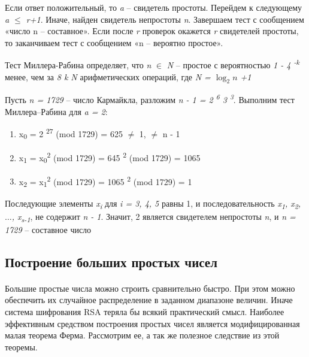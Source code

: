   Если ответ положительный, то \textit{a} – свидетель простоты. Перейдем к следующему \textit{a {$\leq$} r+1}. Иначе, найден свидетель 
непростоты \textit{n}. Завершаем тест с сообщением «число n – составное». Если после \textit{r} проверок окажется \textit{r} свидетелей
простоты, то заканчиваем тест с сообщением «n – вероятно простое».

  \begin{statement}

      Тест Миллера-Рабина определяет, что \textit{n} {$\in$} \textit{N} – простое с вероятностью
    \textit{1 - 4\textsuperscript{ -k}} менее, чем за \textit{8 k N} арифметических операций, где \textit{N = {$\log_{2}{n}$} +1 }
    
  \end{statement}

  \begin{example}    
  
      Пусть \textit{n = 1729} – число Кармайкла, разложим \textit{n - 1 = 2\textsuperscript{ 6} 3\textsuperscript{ 3}}. 
    Выполним тест Миллера–Рабина для \textit{a = 2}:
    
    \begin{enumerate}
    \item x\textsubscript{0} = 2\textsuperscript{ 27} (mod 1729) = 625 {$\ne$} 1, {$\ne$} n - 1
    \item x\textsubscript{1} = x\textsubscript{0}\textsuperscript{2} (mod 1729) = 645\textsuperscript{ 2} (mod 1729) = 1065
    \item x\textsubscript{2} = x\textsubscript{1}\textsuperscript{2} (mod 1729) = 1065\textsuperscript{ 2} (mod 1729) = 1
    \end{enumerate}
    
    Последующие элементы \textit{{x\textsubscript{i}}} для \textit{i = 3, 4, 5} равны 1, и последовательность 
  \textit{{x\textsubscript{1}, x\textsubscript{2}, {$\dots$}, x\textsubscript{s-1}}}, 
  не содержит \textit{n - 1}. Значит, 2 является свидетелем непростоты \textit{n}, и \textit{n = 1729} – составное число
  
  \end{example}

\subsection{Построение больших простых чисел}

\paragraph{} Большие простые числа можно строить сравнительно быстро. При этом можно обеспечить их случайное распределение в 
заданном диапазоне величин. Иначе система шифрования RSA теряла бы всякий практический смысл. Наиболее эффективным средством 
построения простых чисел является модифицированная малая теорема Ферма. Рассмотрим ее, а так же полезное следствие из этой теоремы.

